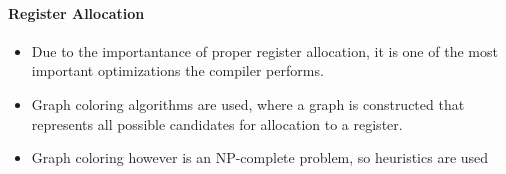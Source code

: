 \paragraph{Register Allocation}
\begin{itemize}
  \item Due to the importantance of proper register allocation, it is one of the most important optimizations the compiler performs.
  \item Graph coloring algorithms are used, where a graph is constructed that represents all possible candidates for allocation to a register.
  \item Graph coloring however is an NP-complete problem, so heuristics are used
\end{itemize}
